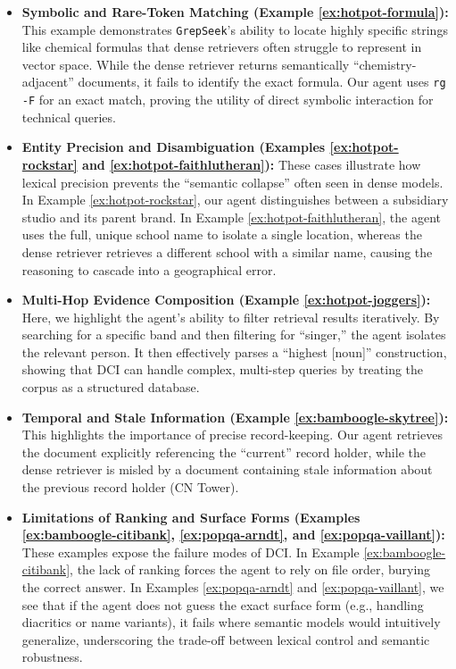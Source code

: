 \documentclass{article} %
\newcommand{\ourmethod}{\texttt{GrepSeek}\xspace}
\begin{document}
\begin{itemize}
    \item \textbf{Symbolic and Rare-Token Matching (Example \ref{ex:hotpot-formula}):} This example demonstrates \ourmethod{}'s ability to locate highly specific strings like chemical formulas that dense retrievers often struggle to represent in vector space. While the dense retriever returns semantically ``chemistry-adjacent'' documents, it fails to identify the exact formula. Our agent uses \texttt{rg -F} for an exact match, proving the utility of direct symbolic interaction for technical queries.
    
    \item \textbf{Entity Precision and Disambiguation (Examples \ref{ex:hotpot-rockstar} and \ref{ex:hotpot-faithlutheran}):} These cases illustrate how lexical precision prevents the ``semantic collapse'' often seen in dense models. In Example \ref{ex:hotpot-rockstar}, our agent distinguishes between a subsidiary studio and its parent brand. In Example \ref{ex:hotpot-faithlutheran}, the agent uses the full, unique school name to isolate a single location, whereas the dense retriever retrieves a different school with a similar name, causing the reasoning to cascade into a geographical error.
    
    \item \textbf{Multi-Hop Evidence Composition (Example \ref{ex:hotpot-joggers}):} Here, we highlight the agent's ability to filter retrieval results iteratively. By searching for a specific band and then filtering for ``singer,'' the agent isolates the relevant person. It then effectively parses a ``highest [noun]'' construction, showing that DCI can handle complex, multi-step queries by treating the corpus as a structured database.
    
    \item \textbf{Temporal and Stale Information (Example \ref{ex:bamboogle-skytree}):} This highlights the importance of precise record-keeping. Our agent retrieves the document explicitly referencing the ``current'' record holder, while the dense retriever is misled by a document containing stale information about the previous record holder (CN Tower).
    
    \item \textbf{Limitations of Ranking and Surface Forms (Examples \ref{ex:bamboogle-citibank}, \ref{ex:popqa-arndt}, and \ref{ex:popqa-vaillant}):} These examples expose the failure modes of DCI. In Example \ref{ex:bamboogle-citibank}, the lack of ranking forces the agent to rely on file order, burying the correct answer. In Examples \ref{ex:popqa-arndt} and \ref{ex:popqa-vaillant}, we see that if the agent does not guess the exact surface form (e.g., handling diacritics or name variants), it fails where semantic models would intuitively generalize, underscoring the trade-off between lexical control and semantic robustness.
\end{itemize}
\end{document}
